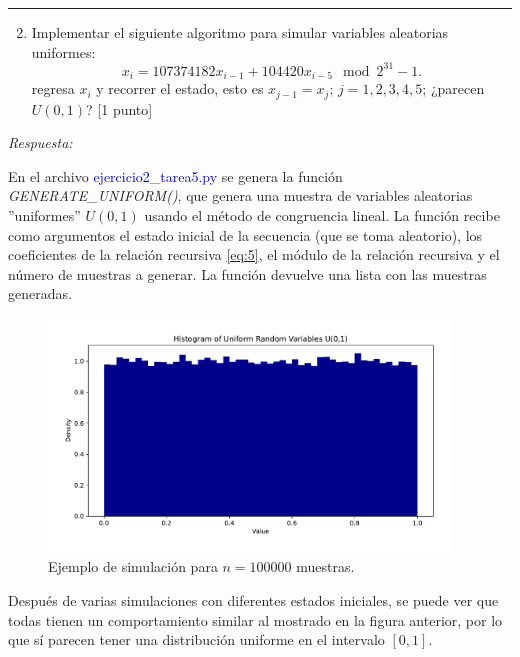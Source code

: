 \vspace{5mm}
{\color{lightgray} \hrule}
\begin{enumerate} \setcounter{enumi}{1}
	\item Implementar el siguiente algoritmo para simular variables aleatorias uniformes:
	\begin{equation} \label{eq:5}
		x_{i} = 107374182 x_{i-1} + 104420 x_{i-5} \mod{2^{31} - 1}.
	\end{equation}
	regresa $x_i$ y recorrer el estado, esto es $x_{j-1} = x_j$; $j=1,2,3,4,5$; ¿parecen $U(0,1)$? [1 punto]
\end{enumerate}

\textcolor{BrickRed}{\it Respuesta:}

En el archivo \textcolor{mediumblue}{ejercicio2\_tarea5.py} se genera la función \textit{GENERATE\_UNIFORM()}, que genera una muestra de variables aleatorias
''uniformes'' $U(0,1)$ usando el método de congruencia lineal. La función recibe como argumentos el estado inicial de la secuencia (que se toma aleatorio), los coeficientes de la relación recursiva \eqref{eq:5}, el módulo de la relación recursiva y el número de muestras a generar. La función devuelve una lista con las muestras generadas.

\begin{figure}[h!]
	\centering
	\includegraphics[width=0.95\textwidth]{IMAGENES/ex_2.pdf}
	\caption{Ejemplo de simulación para $n=100000$ muestras.}
\end{figure}

Después de varias simulaciones con diferentes estados iniciales, se puede ver que todas tienen un comportamiento similar al mostrado en la figura anterior, por lo que sí parecen tener una distribución uniforme en el intervalo $[0,1]$.